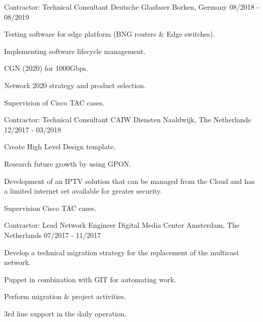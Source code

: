 \begin{cventries}
{\begin{cvitems}
      \end{cvitems}
}
 \cventry
    {Contractor: Technical Consultant} %
    {Deutsche Glasfaser} %
    {Borken, Germany} %
    {08/2018 - 08/2019} %
{
      \begin{cvitems} %
      \item {Testing software for edge platform (BNG routers \& Edge switches).}
      \item {Implementing software lifecycle management.}
      \item {CGN (2020) for 1000Gbps.}
      \item {Network 2020 strategy and product selection.} 
      \item {Supervision of Cisco TAC cases.}
      \end{cvitems}
}
 \cventry
    {Contractor: Technical Consultant} %
    {CAIW Diensten} %
    {Naaldwijk, The Netherlands} %
    {12/2017 - 03/2018} %
	{
      \begin{cvitems} %
    \item {Create High Level Design template.}
    \item {Research future growth by using GPON.}
    \item {Development of an IPTV solution that can be managed from the Cloud and has a limited internet set available for greater security.}
    \item {Supervision Cisco TAC cases.}
      \end{cvitems}
}

  \cventry
	{Contractor: Lead Network Engineer} %
	{Digital Media Center} %
	{Amsterdam, The Netherlands} %
	{07/2017 - 11/2017} %
    {
      \begin{cvitems} %
         \item {Develop a technical migration strategy for the replacement of the multicast network.}
   	 \item {Puppet in combination with GIT for automating work.}
	 \item {Perform migration \& project activities.}
  	 \item {3rd line support in the daily operation.}
      \end{cvitems}
    }


\end{cventries}
